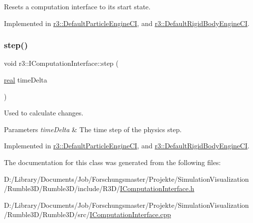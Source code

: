 Resets a computation interface to its start state. 



Implemented in \mbox{\hyperlink{classr3_1_1_default_particle_engine_c_i_a97757c62b4cb1266da29e2b5625bb9d3}{r3\+::\+Default\+Particle\+Engine\+CI}}, and \mbox{\hyperlink{classr3_1_1_default_rigid_body_engine_c_i_a06bd27e94b26017e7960e01f6e884e33}{r3\+::\+Default\+Rigid\+Body\+Engine\+CI}}.

\mbox{\label{classr3_1_1_i_computation_interface_aaa12bcc35005f32a1984b38de97696cb}} 
\subsubsection{\texorpdfstring{step()}{step()}}
{\footnotesize\ttfamily void r3\+::\+I\+Computation\+Interface\+::step (\begin{DoxyParamCaption}\item[{\mbox{\hyperlink{namespacer3_ab2016b3e3f743fb735afce242f0dc1eb}{real}}}]{time\+Delta }\end{DoxyParamCaption})\hspace{0.3cm}{\ttfamily [pure virtual]}}



Used to calculate changes. 


\begin{DoxyParams}{Parameters}
{\em time\+Delta} & The time step of the physics step. \\
\hline
\end{DoxyParams}


Implemented in \mbox{\hyperlink{classr3_1_1_default_particle_engine_c_i_a7c58fd00ec521410e1b412e9885ee0d2}{r3\+::\+Default\+Particle\+Engine\+CI}}, and \mbox{\hyperlink{classr3_1_1_default_rigid_body_engine_c_i_ac45ae1d1889c75e6839b865870cbf59c}{r3\+::\+Default\+Rigid\+Body\+Engine\+CI}}.



The documentation for this class was generated from the following files\+:\begin{DoxyCompactItemize}
\item 
D\+:/\+Library/\+Documents/\+Job/\+Forschungsmaster/\+Projekte/\+Simulation\+Visualization/\+Rumble3\+D/\+Rumble3\+D/include/\+R3\+D/\mbox{\hyperlink{_i_computation_interface_8h}{I\+Computation\+Interface.\+h}}\item 
D\+:/\+Library/\+Documents/\+Job/\+Forschungsmaster/\+Projekte/\+Simulation\+Visualization/\+Rumble3\+D/\+Rumble3\+D/src/\mbox{\hyperlink{_i_computation_interface_8cpp}{I\+Computation\+Interface.\+cpp}}\end{DoxyCompactItemize}
